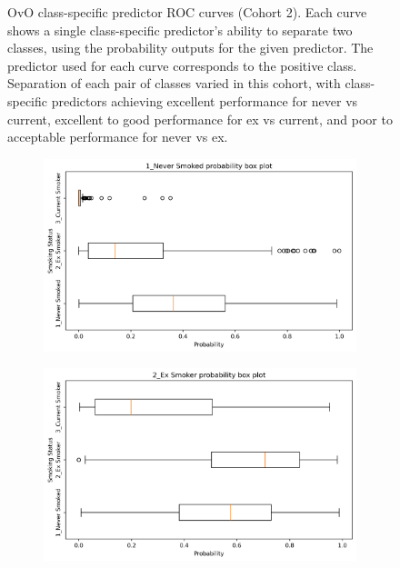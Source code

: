 \documentclass[draft]{article} %
\begin{document}
\begin{figure}[p]
\begin{subfigure}{0.46\linewidth}
    \end{subfigure}
    \caption[Class-specific predictor ROC curves (Cohort 2)]{OvO class-specific predictor ROC curves (Cohort 2). Each curve shows a single class-specific predictor's ability to separate two classes, using the probability outputs for the given predictor. The predictor used for each curve corresponds to the positive class. Separation of each pair of classes varied in this cohort, with class-specific predictors achieving excellent performance for never vs current, excellent to good performance for ex vs current, and poor to acceptable performance for never vs ex.}
    \label{fig:cohort2-initial-rocs}
\end{figure}

\begin{figure}[p]
    \centering
    \begin{subfigure}{0.75\linewidth}
        \centering
        \includegraphics[width=\linewidth]{cohort2/test_boxplot_1.png}
    \end{subfigure}
    \begin{subfigure}{0.75\linewidth}
        \centering
        \includegraphics[width=\linewidth]{cohort2/test_boxplot_2.png}

\end{subfigure}
\end{figure}
\end{document}
